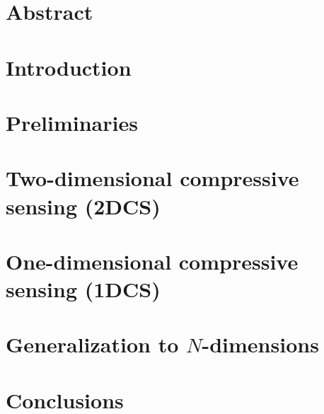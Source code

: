 \documentclass[12pt,oneside]{report}
\begin{document}
\chapter*{Abstract}

\tableofcontents
\listoffigures
\listoftables

\cleardoublepage
{}

\chapter{Introduction}
\label{chap:intro}


\chapter{Preliminaries}
\label{chap:theory}


\chapter{Two-dimensional compressive sensing (2DCS)}
\label{chap:2dcs}


\chapter{One-dimensional compressive sensing (1DCS)}
\label{chap:1dcs}

\chapter{Generalization to $N$-dimensions}
\label{chap:ndcs}

\chapter{Conclusions}
\label{chap:conc}



\end{document}

